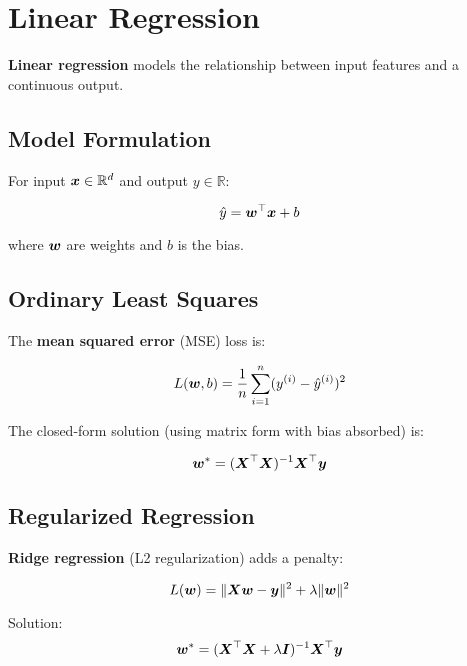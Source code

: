 
\section{Linear Regression}
\label{sec:linear-regression}

\textbf{Linear regression} models the relationship between input features and a continuous output.

\subsection{Model Formulation}

For input $\boldsymbol{x} \in \mathbb{R}^d$ and output $y \in \mathbb{R}$:

\begin{equation}
\hat{y} = \boldsymbol{w}^\top \boldsymbol{x} + b
\end{equation}

where $\boldsymbol{w}$ are weights and $b$ is the bias.

\subsection{Ordinary Least Squares}

The \textbf{mean squared error} (MSE) loss is:

\begin{equation}
L(\boldsymbol{w}, b) = \frac{1}{n} \sum_{i=1}^{n} (y^{(i)} - \hat{y}^{(i)})^2
\end{equation}

The closed-form solution (using matrix form with bias absorbed) is:

\begin{equation}
\boldsymbol{w}^* = (\boldsymbol{X}^\top \boldsymbol{X})^{-1} \boldsymbol{X}^\top \boldsymbol{y}
\end{equation}

\subsection{Regularized Regression}

\textbf{Ridge regression} (L2 regularization) adds a penalty:

\begin{equation}
L(\boldsymbol{w}) = \|\boldsymbol{X}\boldsymbol{w} - \boldsymbol{y}\|^2 + \lambda \|\boldsymbol{w}\|^2
\end{equation}

Solution:
\begin{equation}
\boldsymbol{w}^* = (\boldsymbol{X}^\top \boldsymbol{X} + \lambda \boldsymbol{I})^{-1} \boldsymbol{X}^\top \boldsymbol{y}
\end{equation}

